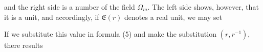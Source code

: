 and the right side is a number of the field $\Omega_m$. The left
side shows, however, that it is a unit, and accordingly, if
$\mathfrak{E}(r)$ denotes a real unit, we may set


If we substitute this value in formula (5) and make the substitution
$(r, r^{-1})$, there results

